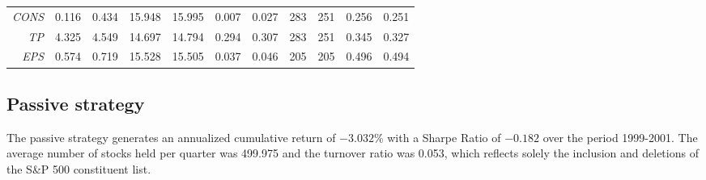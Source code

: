 \documentclass[a4paper,12pt,openright,notitlepage]{report}\usepackage[]{graphicx}\usepackage[]{color}
\begin{document}
\begin{table}[hp]
{\begin{tabular}{rrrrrrrrrrr}
  \textit{CONS}&0.116 & 0.434 & 15.948 & 15.995 & 0.007 & 0.027 &  283 &  251 & 0.256 & 0.251 \\ 
   \textit{TP}&4.325 & 4.549 & 14.697 & 14.794 & 0.294 & 0.307 &  283 &  251 & 0.345 & 0.327 \\ 
   \textit{EPS}&0.574 & 0.719 & 15.528 & 15.505 & 0.037 & 0.046 &  205 &  205 & 0.496 & 0.494 \\ 
   \midrule 

\end{tabular}}


\end{table}


\subsection{Passive strategy}

The passive strategy generates an annualized cumulative return of \ensuremath{-3.032}\% with a Sharpe Ratio  of \ensuremath{-0.182} over the period 1999-2001. The average number of stocks held per quarter was 499.975 and the turnover ratio was 0.053, which reflects solely the inclusion and deletions  of the S\&P 500 constituent list.
\end{document}
